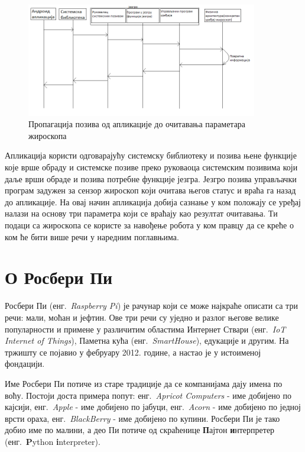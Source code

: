 \documentclass[12pt,oneside]{memoir}
\theoremstyle{remark}
\begin{document}
\begin{figure}[!ht]
\centering
\includegraphics[width=0.9\textwidth]{slike/propagacija_poziva.png}
\caption{Пропагација позива од апликације до очитавања параметара жироскопа}
\label{fig:propagacija}
\end{figure}

Апликација користи одговарајућу системску библиотеку и позива њене функције које врше обраду и системске позиве преко руковаоца системским позивима који даље врши обраде и позива потребне функције језгра. Језгро позива управљачки програм задужен за сензор жироскоп који очитава његов статус и враћа га назад до апликације. На овај начин апликација добија сазнање у ком положају се уређај налази на основу три параметра који се враћају као резултат очитавања. Ти подаци са жироскопа се користе за навођење робота у ком правцу да се креће о ком ће бити више речи у наредним поглавњима.

\chapter{О Росбери Пи}
\label{chp:rpi}
Росбери Пи (енг.~{\em Raspberry Pi}) је рачунар који се може најкраће описати са три речи: мали, моћан и јефтин. Ове три речи су уједно и разлог његове велике популарности и примене у различитим областима Интернет Ствари (енг.~{\em IoT Internet of Things}), Паметна кућа (енг.~{\em SmartHouse}), едукације и другим.
На тржишту се појавио у фебруару 2012. године, а настао је у истоименој фондацији.

Име Росбери Пи потиче из старе традиције да се компанијама дају имена по воћу. Постоји доста примера попут: енг.~{\em Apricot Computers} - име добијено по кајсији, енг.~{\em Apple} - име добијено по јабуци, енг.~{\em Acorn} - име добијено по једној врсти ораха, енг.~{\em BlackBerry} - име добијено по купини. Росбери Пи је тако добио име по малини, а део Пи потиче од скраћенице \textbf{П}ајтон \textbf{и}нтерпретер (енг.~\textbf{P}ython \textbf{i}nterpreter).
\end{document}
